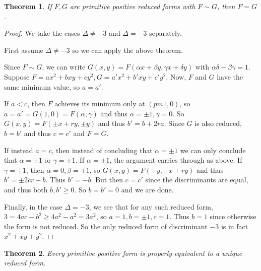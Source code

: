 \documentclass[12pt]{article}
\newtheorem{thm}{Theorem}
\begin{document}
\begin{thm} If $F,G$ are primitive positive reduced forms with $F\sim G$, then $F=G$.
\end{thm}
\begin{proof}
We take the cases $\Delta\neq -3$ and $\Delta=-3$ separately.

First assume $\Delta\neq -3$ so we can apply the above theorem.

Since $F\sim G$, we can write $G(x,y)=F(\alpha x+\beta y,\gamma x+\delta y)$ with $\alpha\delta-\beta\gamma=1$. Suppose $F=ax^2+bxy+cy^2, G=a'x^2+b'xy+c'y^2$. Now, $F$ and $G$ have the same minimum value, so $a=a'$. 

If $a<c$, then $F$ achieves its minimum only at $(pm 1,0)$, so $a=a'=G(1,0)=F(\alpha,\gamma)$ and thus $\alpha=\pm 1, \gamma=0$. So $G(x,y)=F(\pm x+ry,\pm y)$ and thus $b'=b+2ra$. Since $G$ is also reduced, $b=b'$ and thus $c=c'$ and $F=G$.

If instead $a=c$, then instead of concluding that $\alpha=\pm 1$ we can only conclude that $\alpha=\pm 1$ or $\gamma=\pm 1$. If $\alpha=\pm 1$, the argument carries through as above. If $\gamma=\pm 1$, then $\alpha=0, \beta=\mp 1$, so $G(x,y)=F(\mp y,\pm x+ry)$ and thus $b'=\pm 2cr-b$. Thus $b'=-b$. But then $c=c'$ since the discriminants are equal, and thus both $b,b'\geq 0$. So $b=b'=0$ and we are done.

Finally, in the case $\Delta=-3$, we see that for any such reduced form, $3=4ac-b^2\geq 4a^2-a^2=3a^2$, so $a=1, b=\pm 1, c=1$. Thus $b=1$ since otherwise the form is not reduced. So the only reduced form of discriminant $-3$ is in fact $x^2+xy+y^2$.
\end{proof}
\begin{thm}\label{thm:unique}
Every primitive positive form is properly equivalent to a unique reduced form.
\end{thm}
\end{document}
